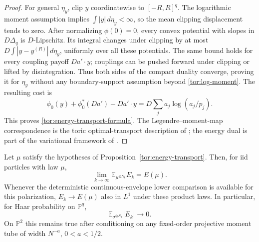 \begin{proof}
For general $\eta_y$, clip $y$ coordinatewise to $[-R,R]^q$.
The logarithmic moment assumption implies $\int|y|\,d\eta_y<\infty$,
so the mean clipping displacement tends to zero.  After normalizing
$\phi(0)=0$, every convex potential with slopes in $D\Delta_q$ is
$D$-Lipschitz.  Its integral changes under clipping by at most
$D\int|y-y^{(R)}|\,d\eta_y$, uniformly over all these potentials.
The same bound holds for every coupling payoff $D a'\cdot y$;
couplings can be pushed forward under clipping or lifted by
disintegration.  Thus both sides of the compact duality converge,
proving it for $\eta_y$ without any boundary-support assumption
beyond \eqref{tor:log-moment}.  The resulting cost is
\[
 \phi_0(y)+\phi_0^*(Da')-Da'\cdot y
 =D\sum_j a_j\log(a_j/p_j).
\]
This proves \eqref{tor:energy-transport-formula}. The Legendre--moment-map
correspondence is the toric optimal-transport description of
\cite{BermanWittNystrom2014}; the energy dual is part of the
variational framework of \cite{BBGZ2013}.
\end{proof}

\begin{theorem}
\label{tor:mean-energy}
Let $\mu$ satisfy the hypotheses of Proposition~\ref{tor:energy-transport}.
Then, for iid particles with law $\mu$,
\begin{equation}
 \lim_{k\to\infty}\mathbb E_{\mu^{\otimes N_k}}E_k=E(\mu).
 \label{tor:mean-energy-limit}
\end{equation}
Whenever the deterministic continuous-envelope lower comparison is
available for this polarization, $E_k\to E(\mu)$ also in $L^1$ under
these product laws. In particular, for Haar probability on $\mathbb P^q$,
\[
 \mathbb E_{\sigma^{\otimes N_k}}|E_k|\longrightarrow0.
\]
On $\mathbb P^2$ this remains true after conditioning on any fixed-order
projective moment tube of width $N^{-a}$, $0<a<1/2$.
\end{theorem}

